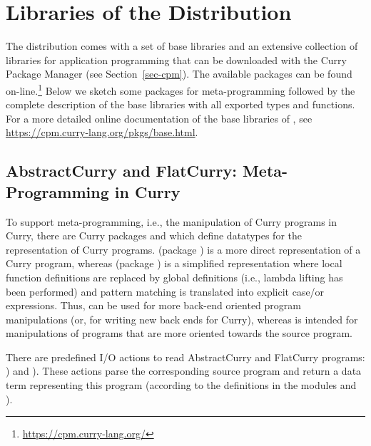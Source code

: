 \section{Libraries of the \CYS Distribution}
\label{sec:libraries}

{\setlength{\parindent}{0.0cm}

The \CYS distribution comes with a set of base libraries
and an extensive collection of libraries for application programming
that can be downloaded with the Curry Package Manager
(see Section~\ref{sec-cpm}).
The available packages can be found on-line.\footnote{%
\url{https://cpm.curry-lang.org/}}
Below we sketch some packages for meta-programming
followed by the complete description of the base libraries
with all exported types and functions.
For a more detailed online documentation of the base libraries of \CYS,
see \url{https://cpm.curry-lang.org/pkgs/base.html}.

\subsection{AbstractCurry and FlatCurry: Meta-Programming in Curry}
\label{sec-flatcurry}

To support meta-programming, i.e., the manipulation of Curry programs
in Curry, there are Curry packages  and 
which define datatypes for the representation of Curry programs.
 (package )
is a more direct representation of a Curry program,
whereas  (package )
is a simplified representation
where local function definitions are replaced by global definitions
(i.e., lambda lifting has been performed) and pattern matching
is translated into explicit case/or expressions.
Thus,  can be used for more back-end oriented
program manipulations (or, for writing new back ends for Curry),
whereas  is intended for manipulations of
programs that are more oriented towards the source program.

There are predefined I/O actions to read AbstractCurry and
FlatCurry programs: )
and ).
These actions parse the corresponding source program and return
a data term representing this program (according to the definitions
in the modules  and ).

}
